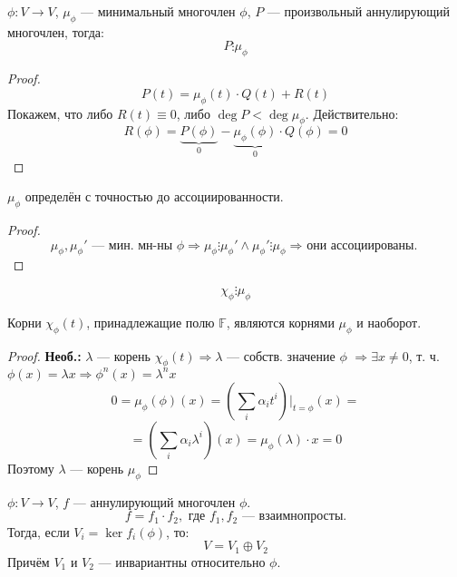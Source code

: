 \begin{statement}
  \label{statement:05_1}
  $\phi \colon V \rightarrow V$, $\mu_\phi$ --- минимальный многочлен $\phi$, $P$ --- произвольный аннулирующий многочлен, тогда:
  \[
  P \vdots \mu_\phi
  \]
\end{statement}
\begin{proof}
  \[
  P(t) = \mu_\phi(t) \cdot Q(t) + R(t)
  \]
  Покажем, что либо $R(t) \equiv 0$, либо $\deg P < \deg \mu_\phi$. Действительно:
  \[
  R(\phi) = \underbrace{P(\phi)}_{0} - \underbrace{\mu_\phi(\phi)}_{0} \cdot Q(\phi) = 0
  \]
\end{proof}
\begin{consequence}
\label{consequence:05_1}
  $\mu_\phi$ определён с точностью до ассоциированности.
\end{consequence}
\begin{proof}
  \[
  \mu_\phi, \mu_\phi' \text{ --- мин. мн-ны $\phi$} \Rightarrow \mu_\phi \vdots \mu_\phi' \land \mu_\phi' \vdots \mu_\phi \text{$\Rightarrow$ они ассоциированы.}
  \]
\end{proof}
\begin{consequence}
\label{consequence:05_2}
\[
\chi_\phi \vdots \mu_\phi
\]
\end{consequence}
\begin{consequence}
\label{consequence:05_3}
Корни $\chi_\phi(t)$, принадлежащие полю $\mathbb{F}$, являются корнями $\mu_\phi$ и наоборот.
\end{consequence}
\begin{proof}
\textbf{Необ.:} $\lambda$ --- корень $\chi_\phi(t) \Rightarrow \lambda$ --- собств. значение $\phi$ $ \Rightarrow \exists x \neq 0$, т. ч. $\phi(x) = \lambda x \Rightarrow \phi^{n}(x) = \lambda^{n}x$
\[
  0 = \mu_\phi(\phi)(x) = \left(\sum_{i}^{} \alpha_i t^{i}\right)\Big|_{t = \phi}(x) = 
\]
\[
 = \left(\sum_{i}^{} \alpha_i \lambda^{i}\right)(x) = \mu_\phi(\lambda) \cdot x = 0
\]
Поэтому $\lambda$ --- корень $\mu_\phi$
\end{proof}
\begin{theorem}
\label{theorem:05_1}
  $\phi \colon V \rightarrow V$, $f$ --- аннулирующий многочлен $\phi$.
  \[
  f = f_1 \cdot f_2, \text{ где $f_1, f_2$ --- взаимнопросты.}
  \]
  Тогда, если $V_i = \ker f_i(\phi)$, то:
  \[
  V = V_1 \oplus V_2
  \]
  Причём $V_1$ и $V_2$ --- инвариантны относительно $\phi$.
\end{theorem}
